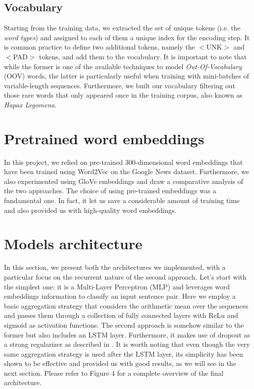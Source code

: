 \documentclass[11pt,a4paper]{article}
\begin{document}
\subsection{Vocabulary}

Starting from the training data, we extracted the set of unique tokens (i.e. the \emph{word types}) and assigned to each of them a unique index for the encoding step. It is common practice to define two additional tokens, namely the $<$UNK$>$ and $<$PAD$>$ tokens, and add them to the vocabulary. It is important to note that while the former is one of the available techniques to model \emph{Out-Of-Vocabulary} (OOV) words, the latter is particularly useful when training with mini-batches of variable-length sequences.
Furthermore, we built our vocabulary filtering out those rare words that only appeared once in the training corpus, also known as \emph{Hapax Legomena}.

\section{Pretrained word embeddings}

In this project, we relied on pre-trained 300-dimensional word embeddings that have been trained using Word2Vec \cite{mikolov2013efficient} on the Google News dataset. Furthermore, we also experimented using GloVe embeddings \cite{pennington2014glove} and draw a comparative analysis of the two approaches. The choice of using pre-trained embeddings was a fundamental one. In fact, it let us save a considerable amount of training time and also provided us with high-quality word embeddings.

\section{Models architecture}

In this section, we present both the architectures we implemented, with a particular focus on the recurrent nature of the second approach. Let's start with the simplest one: it is a Multi-Layer Perceptron (MLP) and leverages word embeddings information to classify an input sentence pair. Here we employ a basic aggregation strategy that considers the arithmetic mean over the sequences and passes them through a collection of fully connected layers with ReLu and sigmoid as activation functions. The second approach is somehow similar to the former but also includes an LSTM layer. Furthermore, it makes use of dropout as a strong regularizer as described in \cite{hinton2012improving}. It is worth noting that even though the very same aggregation strategy is used after the LSTM layer, its simplicity has been shown to be effective and provided us with good results, as we will see in the next section. Please refer to Figure 4 for a complete overview of the final architecture.
\end{document}

